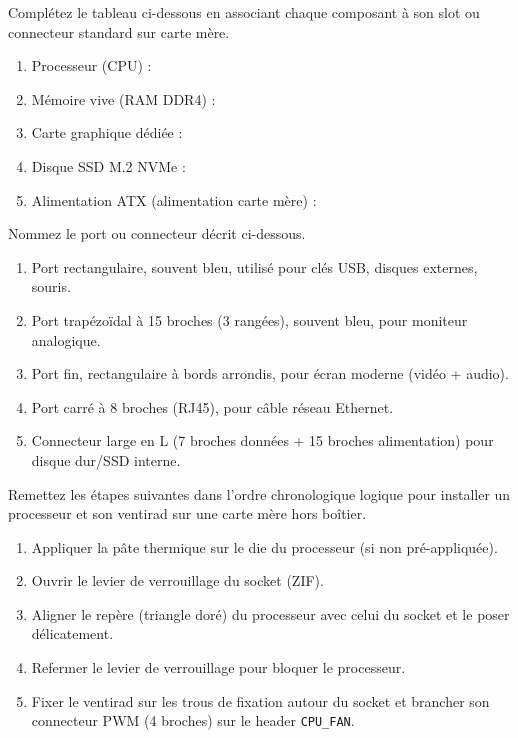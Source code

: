 \documentclass[11pt]{article}
\begin{document}
\begin{exercice}
Complétez le tableau ci-dessous en associant chaque composant à son slot ou connecteur standard sur carte mère.
\begin{enumerate}
    \item Processeur (CPU) : \dotfill
    \item Mémoire vive (RAM DDR4) : \dotfill
    \item Carte graphique dédiée : \dotfill
    \item Disque SSD M.2 NVMe : \dotfill
    \item Alimentation ATX (alimentation carte mère) : \dotfill
\end{enumerate}
\end{exercice}

\begin{exercice}
Nommez le port ou connecteur décrit ci-dessous.
\begin{enumerate}
    \item Port rectangulaire, souvent bleu, utilisé pour clés USB, disques externes, souris.
    \item Port trapézoïdal à 15 broches (3 rangées), souvent bleu, pour moniteur analogique.
    \item Port fin, rectangulaire à bords arrondis, pour écran moderne (vidéo + audio).
    \item Port carré à 8 broches (RJ45), pour câble réseau Ethernet.
    \item Connecteur large en L (7 broches données + 15 broches alimentation) pour disque dur/SSD interne.
\end{enumerate}
\end{exercice}

\begin{exercice}
Remettez les étapes suivantes dans l'ordre chronologique logique pour installer un processeur et son ventirad sur une carte mère hors boîtier.
\begin{enumerate}
    \item Appliquer la pâte thermique sur le die du processeur (si non pré-appliquée).
    \item Ouvrir le levier de verrouillage du socket (ZIF).
    \item Aligner le repère (triangle doré) du processeur avec celui du socket et le poser délicatement.
    \item Refermer le levier de verrouillage pour bloquer le processeur.
    \item Fixer le ventirad sur les trous de fixation autour du socket et brancher son connecteur PWM (4 broches) sur le header \texttt{CPU\_FAN}.
\end{enumerate}
\end{exercice}
\end{document}
